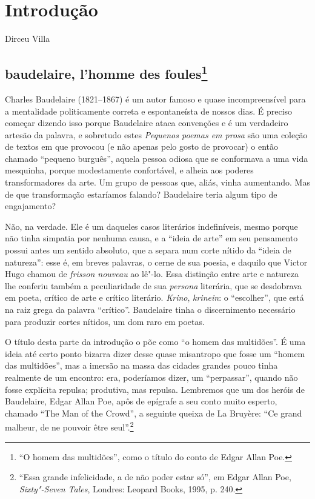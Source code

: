 \chapter*{Introdução}

\begin{flushright}
Dirceu Villa
\end{flushright}

\section*{baudelaire, l'homme des foules\protect\footnote{ “O homem das
multidões”, como o título do conto de Edgar Allan Poe.}}
Charles Baudelaire (1821--1867) é um autor famoso e quase
incompreensível para a mentalidade politicamente correta e
espontaneísta de nossos dias. É preciso começar dizendo isso porque
Baudelaire ataca convenções e é um verdadeiro artesão da palavra, e
sobretudo estes \textit{Pequenos poemas em prosa} são uma coleção de
textos em que provocou (e não apenas pelo gosto de provocar) o então
chamado “pequeno burguês”, aquela pessoa odiosa que se conformava a uma
vida mesquinha, porque modestamente confortável, e alheia aos poderes
transformadores da arte. Um grupo de pessoas que, aliás, vinha
aumentando. Mas de que transformação estaríamos falando? Baudelaire
teria algum tipo de engajamento?

Não, na verdade. Ele é um daqueles casos literários indefiníveis, mesmo
porque não tinha simpatia por nenhuma causa, e a “ideia de arte”
em seu pensamento possui antes um sentido absoluto, que a separa num
corte nítido da “ideia de natureza”: esse é, em breves palavras,
o cerne de sua poesia, e daquilo que Victor Hugo chamou de \textit{frisson
nouveau} ao lê"-lo. Essa distinção entre arte e natureza lhe
conferiu também a peculiaridade de sua \textit{persona} literária, que
se desdobrava em poeta, crítico de arte e crítico literário. \textit{Krino},
\textit{krinein}: o “escolher”, que está na raiz grega da palavra
 “crítico”. Baudelaire tinha o discernimento necessário para
produzir cortes nítidos, um dom raro em poetas.

O título desta parte da introdução o põe como “o homem das multidões”. É uma ideia
até certo ponto bizarra dizer desse quase misantropo que fosse
um “homem das multidões”, mas a imersão na massa das cidades grandes
pouco tinha realmente de um encontro: era, poderíamos dizer, um
 “perpassar”, quando não fosse explícita repulsa; produtiva, mas
repulsa. Lembremos que um dos heróis de Baudelaire, Edgar Allan Poe,
apôs de epígrafe a seu conto muito esperto, chamado “The Man of the
Crowd”, a seguinte queixa de La Bruyère: “Ce grand malheur, de ne
pouvoir être seul”.\footnote{ “Essa grande infelicidade, a de não poder
estar só”, em Edgar Allan Poe, \textit{Sixty"-Seven Tales}, Londres: Leopard
Books, 1995, p. 240.}

